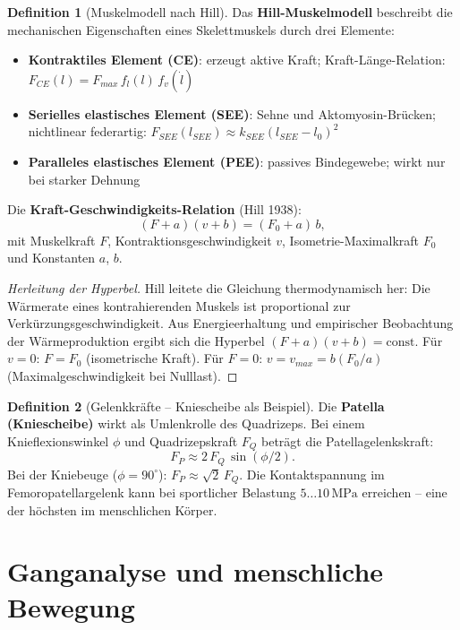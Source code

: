 ﻿\documentclass[a4paper,12pt]{report}
\theoremstyle{definition}
\newtheorem{definition}{Definition}
\begin{document}
\begin{definition}[Muskelmodell nach Hill]
Das \textbf{Hill-Muskelmodell} beschreibt die mechanischen Eigenschaften
eines Skelettmuskels durch drei Elemente:
\begin{itemize}
    \item[-] \textbf{Kontraktiles Element (CE)}: erzeugt aktive Kraft;
          Kraft-Länge-Relation: $F_{CE}(l) = F_{max}\,f_l(l)\,f_v(\dot{l})$
    \item[-] \textbf{Serielles elastisches Element (SEE)}: Sehne und Aktomyosin-Brücken;
          nichtlinear federartig: $F_{SEE}(l_{SEE}) \approx k_{SEE}(l_{SEE}-l_0)^2$
    \item[-] \textbf{Paralleles elastisches Element (PEE)}: passives Bindegewebe;
          wirkt nur bei starker Dehnung
\end{itemize}
Die \textbf{Kraft-Geschwindigkeits-Relation} (Hill 1938):
\[
  (F + a)(v + b) = (F_0 + a)\,b,
\]
mit Muskelkraft $F$, Kontraktionsgeschwindigkeit $v$,
Isometrie-Maximalkraft $F_0$ und Konstanten $a$, $b$.
\end{definition}
\begin{proof}[Herleitung der Hyperbel]
Hill leitete die Gleichung thermodynamisch her:
Die Wärmerate eines kontrahierenden Muskels ist proportional zur Verkürzungsgeschwindigkeit.
Aus Energieerhaltung und empirischer Beobachtung der Wärmeproduktion
ergibt sich die Hyperbel $(F+a)(v+b)=\mathrm{const}$.
Für $v = 0$: $F = F_0$ (isometrische Kraft).
Für $F = 0$: $v = v_{max} = b(F_0/a)$ (Maximalgeschwindigkeit bei Nulllast).
\end{proof}

\begin{definition}[Gelenkkräfte -- Kniescheibe als Beispiel]
Die \textbf{Patella (Kniescheibe)} wirkt als Umlenkrolle des Quadrizeps.
Bei einem Knieflexionswinkel $\phi$ und Quadrizepskraft $F_Q$ beträgt
die Patellagelenkskraft:
\[
  F_P \approx 2\,F_Q\,\sin(\phi/2).
\]
Bei der Kniebeuge ($\phi = 90^\circ$): $F_P \approx \sqrt{2}\,F_Q$.
Die Kontaktspannung im Femoropatellargelenk kann bei sportlicher Belastung
$5\ldots10\,\mathrm{MPa}$ erreichen -- eine der höchsten im menschlichen Körper.
\end{definition}

\section{Ganganalyse und menschliche Bewegung}
\end{document}

